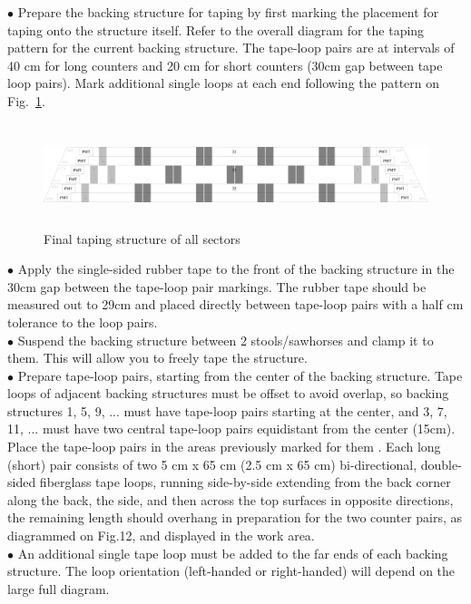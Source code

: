 $\bullet$ Prepare the backing structure for taping by first marking the placement for
taping onto the structure itself. Refer to the overall diagram for the taping
pattern for the current backing structure. The tape-loop pairs are at intervals of
40 cm for long counters and 20 cm for short counters (30cm gap between tape loop
pairs). Mark additional single loops at each end following the pattern on
Fig.~\ref{sector3135}.\\
\begin{figure}[h!]
\centerline{\includegraphics[width=13cm,height=3cm]{ye/fig_ye_pmt_test/sector-31-35.pdf}}
\caption{Final taping structure of all sectors }
\label{sector3135}
\end{figure}
$\bullet$ Apply the single-sided rubber tape to the front of the backing structure in the
30cm gap between the tape-loop pair markings. The rubber tape should be
measured out to 29cm and placed directly between tape-loop pairs with a half
cm tolerance to the loop pairs.\\
$\bullet$ Suspend the backing structure between 2 stools/sawhorses and clamp it to them.
This will allow you to freely tape the structure.\\
$\bullet$ Prepare tape-loop pairs, starting from the center of the backing structure. Tape
loops of adjacent backing structures must be offset to avoid overlap, so backing
structures 1, 5, 9, ... must have tape-loop pairs starting at the center, and 3, 7,
11, ... must have two central tape-loop pairs equidistant from the center (15cm).
Place the tape-loop pairs in the areas previously marked for them . Each long
(short) pair consists of two 5 cm x 65 cm (2.5 cm x 65 cm) bi-directional,
double-sided fiberglass tape loops, running side-by-side extending from the
back corner along the back, the side, and then across the top surfaces in
opposite directions, the remaining length should overhang in preparation for the
two counter pairs, as diagrammed on Fig.12, and displayed in the
work area.\\
$\bullet$ An additional single tape loop must be added to the far ends of each backing
structure. The loop orientation (left-handed or right-handed) will depend on the
large full diagram.\\
